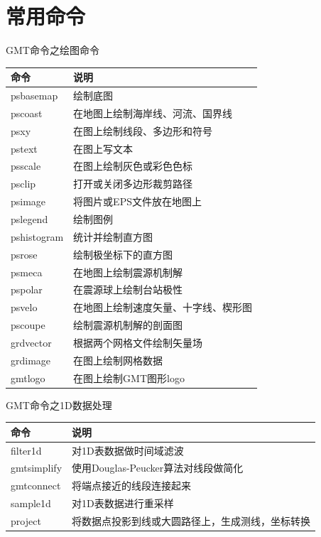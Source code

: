 \documentclass[UTF8, 11pt]{ctexbeamer}
\begin{document}
\section{常用命令}
\begin{frame}{GMT命令之绘图命令}
\begin{center}
\small
\begin{tabular}{ll}
\hline
命令 & 说明 \\
\hline
psbasemap & 绘制底图 \\
pscoast & 在地图上绘制海岸线、河流、国界线 \\
psxy & 在图上绘制线段、多边形和符号 \\
pstext & 在图上写文本 \\
psscale & 在图上绘制灰色或彩色色标 \\
psclip & 打开或关闭多边形裁剪路径 \\
psimage & 将图片或EPS文件放在地图上 \\
pslegend & 绘制图例 \\
pshistogram & 统计并绘制直方图 \\
psrose & 绘制极坐标下的直方图\\
psmeca & 在地图上绘制震源机制解 \\
pspolar & 在震源球上绘制台站极性 \\
psvelo & 在地图上绘制速度矢量、十字线、楔形图 \\
pscoupe & 绘制震源机制解的剖面图 \\
grdvector & 根据两个网格文件绘制矢量场 \\
grdimage & 在图上绘制网格数据 \\
gmtlogo & 在图上绘制GMT图形logo \\
\hline
\end{tabular}
\end{center}
\end{frame}

\begin{frame}{GMT命令之1D数据处理}
\begin{center}
\small
\begin{tabular}{ll}
\hline
命令 & 说明 \\
\hline
filter1d & 对1D表数据做时间域滤波 \\
gmtsimplify & 使用Douglas-Peucker算法对线段做简化 \\
gmtconnect & 将端点接近的线段连接起来 \\
sample1d & 对1D表数据进行重采样 \\
project & 将数据点投影到线或大圆路径上，生成测线，坐标转换 \\
\hline
\end{tabular}
\end{center}
\end{frame}
\end{document}
